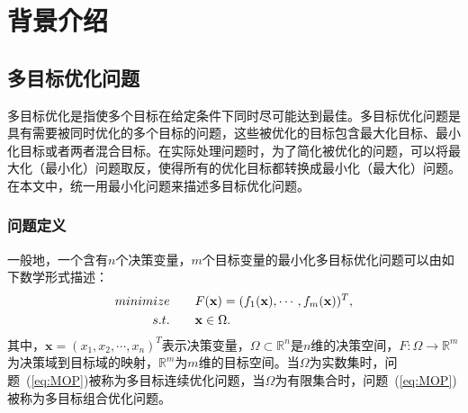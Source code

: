 \chapter{背景介绍}
\label{chap:背景介绍}
\section{多目标优化问题}
\label{sec:背景介绍:多目标优化问题}
多目标优化是指使多个目标在给定条件下同时尽可能达到最佳。多目标优化问题是具有需要被同时优化的多个目标的问题，这些被优化的目标包含最大化目标、最小化目标或者两者混合目标。在实际处理问题时，为了简化被优化的问题，可以将最大化（最小化）问题取反，使得所有的优化目标都转换成最小化（最大化）问题。在本文中，统一用最小化问题来描述多目标优化问题。

\subsection{问题定义}
\label{subsec:背景介绍:多目标优化问题:问题定义}
一般地，一个含有$n$个决策变量，$m$个目标变量的最小化多目标优化问题可以由如下数学形式描述：
\begin{align}
    \label{eq:MOP}
    minimize \qquad & F(\mathbf{x}) = (f_1(\mathbf{x}), \cdots, f_m(\mathbf{x}))^T,  \\
    s.t. \qquad & \mathbf{x} \in \Omega. \notag
\end{align}
其中，$\mathbf{x} = (x_1, x_2, \cdots, x_n)^T$表示决策变量，$\Omega \subset \mathbb{R}^n$是$n$维的决策空间，$F: \Omega \rightarrow \mathbb{R}^m$为决策域到目标域的映射，$\mathbb{R}^m$为$m$维的目标空间。当$\Omega$为实数集时，问题~(\ref{eq:MOP})被称为多目标连续优化问题，当$\Omega$为有限集合时，问题~(\ref{eq:MOP})被称为多目标组合优化问题。

